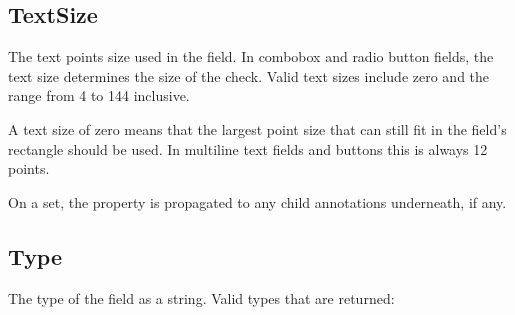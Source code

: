 \documentclass[letterpaper,12pt,english,openany,oneside]{sphinxmanual}
\begin{document}
\begin{sphinxVerbatim}[commandchars=\\\{\}]
  
\end{sphinxVerbatim}




\subsection{TextSize}
\label{\detokenize{IAC_API_FormsIntro:textsize}}
The text points size used in the field. In combobox and radio button fields, the text size determines the size of the check. Valid text sizes include zero and the range from 4 to 144 inclusive.

A text size of zero means that the largest point size that can still fit in the field’s rectangle should be used. In multi\sphinxhyphen{}line text fields and buttons this is always 12 points.

On a set, the property is propagated to any child annotations underneath, if any.

\label{\detokenize{IAC_API_FormsIntro:syntax-30}}

\begin{sphinxVerbatim}[commandchars=\\\{\}]
\PYG{p}{[}\PYG{p}{]} 
\end{sphinxVerbatim}
\label{\detokenize{IAC_API_FormsIntro:example-19}}

\begin{sphinxVerbatim}[commandchars=\\\{\}]
  
\end{sphinxVerbatim}




\subsection{Type}
\label{\detokenize{IAC_API_FormsIntro:type}}
The type of the field as a string. Valid types that are returned:

\begin{sphinxVerbatim}[commandchars=\\\{\}]
\end{sphinxVerbatim}
\label{\detokenize{IAC_API_FormsIntro:syntax-31}}
\end{document}

